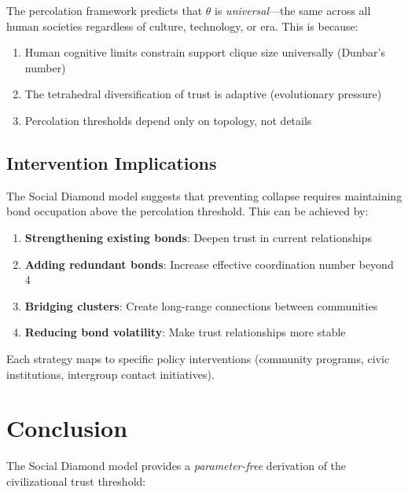 \documentclass[11pt]{article}
\begin{document}
The percolation framework predicts that $\theta$ is \emph{universal}---the same across all human societies regardless of culture, technology, or era. This is because:
\begin{enumerate}
\item Human cognitive limits constrain support clique size universally (Dunbar's number)
\item The tetrahedral diversification of trust is adaptive (evolutionary pressure)
\item Percolation thresholds depend only on topology, not details
\end{enumerate}

\subsection{Intervention Implications}

The Social Diamond model suggests that preventing collapse requires maintaining bond occupation above the percolation threshold. This can be achieved by:
\begin{enumerate}
\item \textbf{Strengthening existing bonds}: Deepen trust in current relationships
\item \textbf{Adding redundant bonds}: Increase effective coordination number beyond 4
\item \textbf{Bridging clusters}: Create long-range connections between communities
\item \textbf{Reducing bond volatility}: Make trust relationships more stable
\end{enumerate}

Each strategy maps to specific policy interventions (community programs, civic institutions, intergroup contact initiatives).

\section{Conclusion}

The Social Diamond model provides a \emph{parameter-free} derivation of the civilizational trust threshold:

\begin{center}
\end{center}
\end{document}
